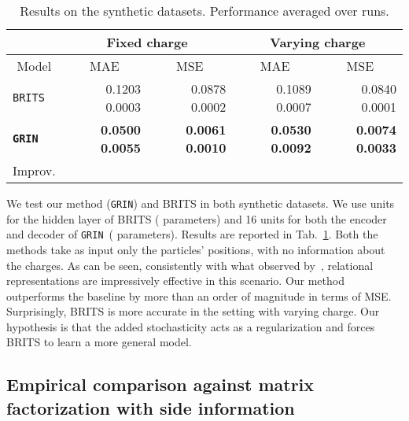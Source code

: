 \documentclass{article} \usepackage{iclr2022_conference,times}
\newcommand{\GRIL}{\texttt{GRIN}}
\begin{document}
\begin{table}[ht]
\vspace{-0.2cm}
\caption{Results on the synthetic datasets. Performance averaged over  runs.}
\vspace{0.1cm}
\centering
\begin{tabular}{ l | r | r | r | r }
\toprule
 \multicolumn{1}{c}{} &\multicolumn{2}{c}{Fixed charge} & \multicolumn{2}{c}{Varying charge} \\
\toprule
 \multicolumn{1}{c}{Model}&\multicolumn{1}{|c}{\small MAE} & \multicolumn{1}{|c}{\small MSE} & \multicolumn{1}{|c}{\small MAE} & \multicolumn{1}{|c}{\small MSE} \\
\midrule
\texttt{BRITS} & 0.1203 {\tiny  0.0003} & 0.0878 {\tiny  0.0002} & 0.1089 {\tiny  0.0007} & 0.0840 {\tiny  0.0001}\\
\midrule[0.3pt]
\texttt{\textbf{\GRIL}} & \textbf{0.0500 {\tiny  0.0055}} & \textbf{0.0061 {\tiny  0.0010}} & \textbf{0.0530 {\tiny  0.0092}} & \textbf{0.0074 {\tiny  0.0033}}\\
\midrule
\midrule
Improv. &  &  &  & \\
\bottomrule
\end{tabular}
\label{t:synthetic}
\end{table} 
We test our method (\GRIL) and BRITS in both synthetic datasets. We use  units for the hidden layer of BRITS ( parameters) and 16 units for both the encoder and decoder of \GRIL~( parameters). Results are reported in Tab.~\ref{t:synthetic}. Both the methods take as input only the particles' positions, with no information about the charges. As can be seen, consistently with what observed by~\citet{kipf2018neural}, relational representations are impressively effective in this scenario. Our method outperforms the baseline by more than an order of magnitude in terms of MSE. Surprisingly, BRITS is more accurate in the setting with varying charge. Our hypothesis is that the added stochasticity acts as a regularization and forces BRITS to learn a more general model.

\subsection{Empirical comparison against matrix factorization with side information}
\end{document}
